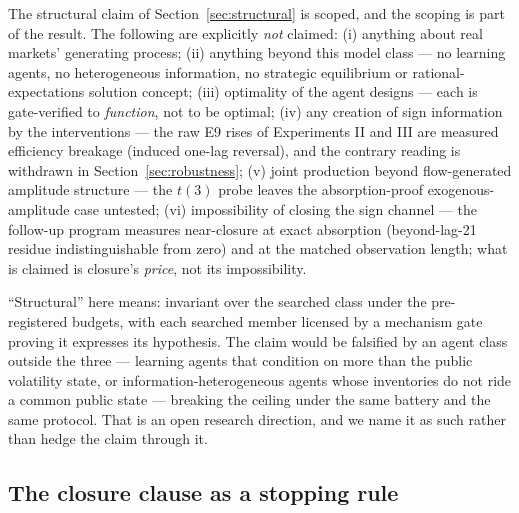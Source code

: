 \documentclass[11pt]{article}
\begin{document}
The structural claim of Section~\ref{sec:structural} is scoped, and the
scoping is part of the result. The following are explicitly \emph{not}
claimed: (i) anything about real markets' generating process; (ii) anything
beyond this model class --- no learning agents, no heterogeneous
information, no strategic equilibrium or rational-expectations solution
concept; (iii) optimality of the agent designs --- each is gate-verified to
\emph{function}, not to be optimal; (iv) any creation of sign information
by the interventions --- the raw E9 rises of Experiments II and III are
measured efficiency breakage (induced one-lag reversal), and the contrary
reading is withdrawn in Section~\ref{sec:robustness}; (v) joint
production beyond flow-generated amplitude structure --- the $t(3)$ probe
leaves the absorption-proof exogenous-amplitude case untested; (vi)
impossibility of closing the sign channel --- the follow-up program
measures near-closure at exact absorption (beyond-lag-21 residue
indistinguishable from zero) and at the matched observation length; what
is claimed is closure's \emph{price}, not its impossibility.

``Structural'' here means: invariant over the searched class under the
pre-registered budgets, with each searched member licensed by a mechanism gate
proving it expresses its hypothesis. The claim would be falsified by an agent
class outside the three --- learning agents that condition on more than the
public volatility state, or information-heterogeneous agents whose inventories
do not ride a common public state --- breaking the ceiling under the same
battery and the same protocol. That is an open research direction, and we
name it as such rather than hedge the claim through it.

\subsection{The closure clause as a stopping rule}
\label{sec:closure}
\end{document}
